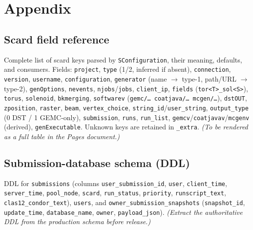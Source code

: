 \section{Appendix}

\subsection{Scard field reference}

Complete list of scard keys parsed by \texttt{SConfiguration}, their meaning, defaults, and consumers. Fields:
\texttt{project}, \texttt{type} (1/2, inferred if absent), \texttt{connection}, \texttt{version},
\texttt{username}, \texttt{configuration}, \texttt{generator} (name $\rightarrow$ type-1, path/URL
$\rightarrow$ type-2), \texttt{genOptions}, \texttt{nevents}, \texttt{njobs}/\texttt{jobs},
\texttt{client\_\allowbreak{}ip}, \texttt{fields} (\texttt{tor<T>\_\allowbreak{}sol<S>}), \texttt{torus},
\texttt{solenoid}, \texttt{bkmerging}, \texttt{softwarev} (\texttt{gemc/\allowbreak{}\ldots{}
coatjava/\allowbreak{}\ldots{} mcgen/\allowbreak{}\ldots{}}), \texttt{dstOUT}, \texttt{zposition},
\texttt{raster}, \texttt{beam}, \texttt{vertex\_\allowbreak{}choice},
\texttt{string\_\allowbreak{}id}/\texttt{user\_\allowbreak{}string}, \texttt{output\_\allowbreak{}type} (0 DST
/ 1 GEMC-only), \texttt{submission}, \texttt{runs}, \texttt{run\_\allowbreak{}list},
\texttt{gemcv}/\texttt{coatjavav}/\texttt{mcgenv} (derived), \texttt{genExecutable}. Unknown keys are retained
in \texttt{\_\allowbreak{}extra}. \textit{(To be rendered as a full table in the Pages document.)}

\subsection{Submission-database schema (DDL)}

DDL for \texttt{submissions} (columns \texttt{user\_\allowbreak{}submission\_\allowbreak{}id}, \texttt{user},
\texttt{client\_\allowbreak{}time}, \texttt{server\_\allowbreak{}time}, \texttt{pool\_\allowbreak{}node},
\texttt{scard}, \texttt{run\_\allowbreak{}status}, \texttt{priority}, \texttt{runscript\_\allowbreak{}text},
\texttt{clas12\_\allowbreak{}condor\_\allowbreak{}text}), \texttt{users}, and
\texttt{owner\_\allowbreak{}submission\_\allowbreak{}snapshots} (\texttt{snapshot\_\allowbreak{}id},
\texttt{update\_\allowbreak{}time}, \texttt{database\_\allowbreak{}name}, \texttt{owner},
\texttt{payload\_\allowbreak{}json}). \textit{(Extract the authoritative DDL from the production schema before
release.)}

